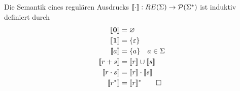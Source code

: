 \begin{Def}[name={[Semantik eines regulären Ausdrucks]}]
        Die Semantik eines regulären Ausdrucks $\llbracket\cdot \rrbracket : RE(\Sigma) \-> \mathcal{P}(\Sigma^*)$ ist induktiv definiert durch
        \begin{align*}
                \llbracket \0 \rrbracket &= \varnothing\\
                \llbracket \1 \rrbracket &= \{\Eps\}\\
                \llbracket a \rrbracket &= \{a\} \quad a\in\Sigma\\
                \llbracket r+s \rrbracket &= \llbracket r\rrbracket \cup \llbracket s\rrbracket\\
                \llbracket r\cdot s \rrbracket &= \llbracket r\rrbracket \cdot \llbracket s\rrbracket\\
                \llbracket r^* \rrbracket &= \llbracket r\rrbracket^* \qedhere
        \end{align*}
\end{Def}
%
